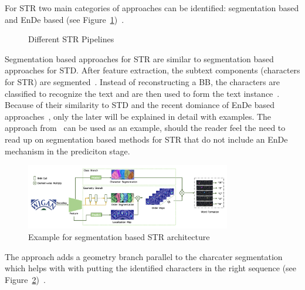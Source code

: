 For \ac{STR} two main categories of approaches can be identified: segmentation based and
\ac{EnDe} based (see Figure~\ref{fig:str-pipelines})~\citep{chen_text_2021}.
\begin{figure}[h]
    \centering
    
    \caption{Different STR Pipelines\label{fig:str-pipelines}}
\end{figure}
Segmentation based approaches for \ac{STR} are similar to segmentation based approaches for \ac{STD}.
After feature extraction, the subtext components (characters for \ac{STR}) are
segmented~\citep{chen_text_2021}.
Instead of reconstructing a \ac{BB}, the characters are classified to recognize the
text and are then used to form the text instance~\citep{chen_text_2021}.
Because of their similarity to \ac{STD} and the recent domiance of \ac{EnDe} based
approaches~\citep{chen_text_2021,long_scene_2021}, only the later will be explained in detail with
examples.
The approach from~\cite{wan_textscanner_2020} can be used as an example, should the reader feel the
need to read up on segmentation based methods for \ac{STR} that do not include an \ac{EnDe}
mechanism in the prediciton stage.
\begin{figure}[h]
    \centering
    \includegraphics[width=0.8\textwidth]{img/STR-seg-based-wan-textscaner-2020.png}
    \caption[Segmentation based STR architecture]{%
        Example for segmentation based STR
        architecture~\citep{wan_textscanner_2020}\label{fig:STR-segbased-architecture}
    }
\end{figure}
The approach adds a geometry branch parallel to the charcater segmentation which helps with with
putting the identified characters in the right sequence (see
Figure~\ref{fig:STR-segbased-architecture})~\citep{wan_textscanner_2020}.

